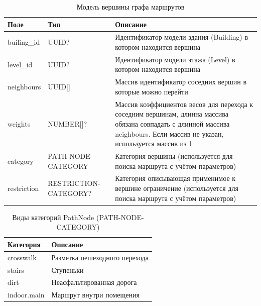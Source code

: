           \begin{center}
            \begin{xltabular}{\linewidth}{|l|p{4cm}|X|}
              \caption{Модель вершины графа маршрутов}\\\hline
              Поле        & Тип                   & Описание                                                                                                                                                                    \\ \hline
              builing\_id & UUID?                 & Идентификатор модели здания (Building) в котором находится вершина                                                                                                          \\ \hline
              level\_id   & UUID?                 & Идентификатор модели этажа (Level) в котором находится вершина                                                                                                              \\ \hline
              neighbours  & UUID[]                & Массив идентификатор соседних вершин в которые можно перейти                                                                                                                \\ \hline
              weights     & NUMBER[]?             & Массив коэффициентов весов для перехода к соседним вершинам, длинна массива обязана совпадать с длинной массива neighbours. Если массив не указан, используется массив из 1 \\ \hline
              category    & PATH-NODE-CATEGORY    & Категория вершины (используется для поиска маршрута с учётом параметров)                                                                                                    \\ \hline
              restriction & RESTRICTION-CATEGORY? & Категория описывающая применимое к вершине ограничение (используется для поиска маршрута с учётом параметров)                                                               \\ \hline
            \end{xltabular}
          \end{center}

          \begin{center}
            \begin{xltabular}{\linewidth}{|l|X|}
              \caption{Виды категорий PathNode (PATH-NODE-CATEGORY)}\\             \hline
              Категория   & Описание                      \\ \hline
              crosswalk   & Разметка пешеходного перехода \\ \hline
              stairs      & Ступеньки                     \\ \hline
              dirt        & Неасфальтированная дорога     \\ \hline
              indoor.main & Маршрут внутри помещения      \\ \hline
            \end{xltabular}
          \end{center}


